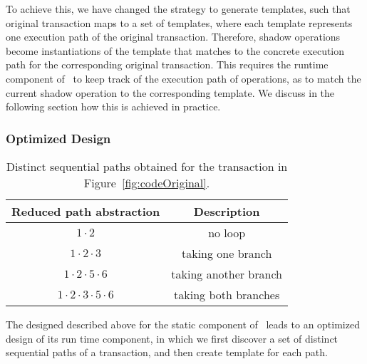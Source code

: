 To achieve this, we have changed the strategy to generate templates, such that
original transaction maps to a set of templates, where each template represents one
execution path of the original transaction. Therefore, shadow operations become 
instantiations of the template that matches to the concrete execution path for the corresponding
original transaction. This requires the runtime component of \tool\ to keep track of the execution
path of operations, as to match the current shadow operation to the corresponding template.
We discuss in the following section how this is achieved in practice.

\subsubsection{Optimized Design}
\begin{table}[t!]
\centering
\begin{tabular}{|c|c|}
\hline
Reduced path abstraction& Description \\\hline
$1\cdot2$ & no loop\\
$1\cdot2\cdot3$ & taking one branch\\
$1\cdot2\cdot5\cdot6$ & taking another branch\\
$1\cdot2\cdot3\cdot5\cdot6$ & taking both branches\\
\hline
\end{tabular}
\caption{Distinct sequential paths obtained for the transaction in Figure~\ref{fig:codeOriginal}.}
\label{tab:pathreduce}
\end{table}

The designed described above for the static component of \tool\ leads to an optimized design of its run time component, in which
we first discover a set of distinct sequential paths of a transaction, and then
create template for each path. 

